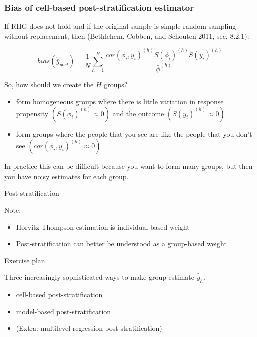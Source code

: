 \documentclass[aspectratio=169]{beamer}
\begin{document}
\begin{frame}
\frametitle{Bias of cell-based post-stratification estimator}

If RHG does not hold and if the original sample is simple random sampling without replacement, then (Bethlehem, Cobben, and Schouten 2011, sec. 8.2.1):

$$bias(\hat{\bar{y}}_{post}) = \frac{1}{N} \sum_{h=1}^H \frac{cor(\phi_i, y_i)^{(h)} S(\phi_i)^{(h)} S(y_i)^{(h)}}{\bar{\phi}^{(h)}}$$

So, how should we create the $H$ groups? \pause
\begin{itemize}
\item form homogeneous groups where there is little variation in response propensity $(S(\phi_i)^{(h)} \approx 0)$ and the outcome $(S(y_i)^{(h)} \approx 0)$ \pause
\item form groups where the people that you see are like the people that you don't see $(cor(\phi_i, y_i)^{(h)} \approx 0)$
\end{itemize}

\vfill
In practice this can be difficult because you want to form many groups, but then you have noisy estimates for each group.

\end{frame}
\begin{frame}{Post-stratification}

Note:
\begin{itemize}
\item Horvitz-Thompson estimation is individual-based weight
\item Post-stratification can better be understood as a group-based weight
\end{itemize}

\end{frame}
\begin{frame}{Exercise plan}

Three increasingly sophisticated ways to make group estimate $\hat{\bar{y}}_h$. 
\begin{itemize}
\item cell-based post-stratification
\item model-based post-stratification
\item (Extra: multilevel regression post-stratification)
\end{itemize}

\end{frame}
\end{document}
